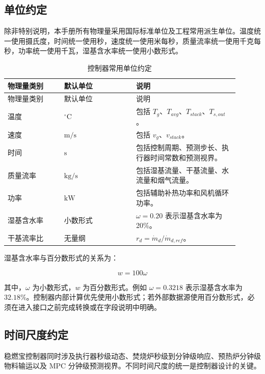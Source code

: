 \documentclass[UTF8,openany,zihao=-4,oneside]{ctexbook}
\begin{document}
\subsection{单位约定}\label{subsec:units}

除非特别说明，本手册所有物理量采用国际标准单位及工程常用派生单位。温度统一使用摄氏度，时间统一使用秒，速度统一使用米每秒，质量流率统一使用千克每秒，功率统一使用千瓦，湿基含水率统一使用小数形式。

\begin{longtable}{@{}p{0.22\linewidth}p{0.28\linewidth}p{0.40\linewidth}@{}}
\caption{控制器常用单位约定}\label{tab:units}\\
\toprule
物理量类别 & 默认单位 & 说明 \\
\midrule
\endfirsthead
\toprule
物理量类别 & 默认单位 & 说明 \\
\midrule
\endhead
温度 & \(^\circ\mathrm{C}\) & 包括 \(T_g\)、\(T_{avg}\)、\(T_{stack}\)、\(T_{s,out}\)。 \\
速度 & \(\mathrm{m/s}\) & 包括 \(v_g\)、\(v_{stack}\)。 \\
时间 & \(\mathrm{s}\) & 包括控制周期、预测步长、执行器时间常数和预测视界。 \\
质量流率 & \(\mathrm{kg/s}\) & 包括湿基流量、干基流量、水流量和烟气流量。 \\
功率 & \(\mathrm{kW}\) & 包括辅助补热功率和风机循环功率。 \\
湿基含水率 & 小数形式 & \(\omega=0.20\) 表示湿基含水率为 20\%。 \\
干基流率比 & 无量纲 & \(r_d=\dot m_d/\dot m_{d,ref}\)。 \\
\bottomrule
\end{longtable}

湿基含水率与百分数形式的关系为：

\[
w=100\omega
\]

其中，\(\omega\) 为小数形式，\(w\) 为百分数形式。例如 \(\omega=0.3218\) 表示湿基含水率为 \(32.18\%\)。控制器内部计算优先使用小数形式；若外部数据源使用百分数形式，必须在进入接口之前完成转换或在字段说明中明确。

\subsection{时间尺度约定}\label{subsec:time-scale}

稳燃宝控制器同时涉及执行器秒级动态、焚烧炉秒级到分钟级响应、预热炉分钟级物料输运以及 MPC 分钟级预测视界。不同时间尺度的统一是控制器设计的关键。
\end{document}
